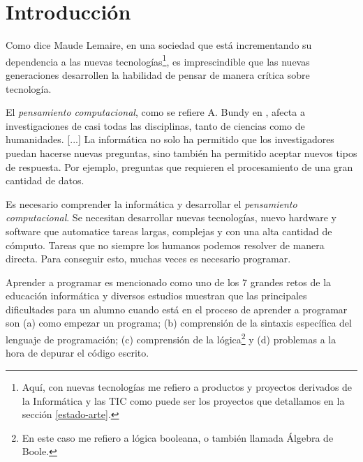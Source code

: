 \chapter{Introducción}\label{introduccion}



Como dice Maude Lemaire\cite{lemaire2014incorporating}, en una sociedad que está incrementando su dependencia a las nuevas tecnologías\footnote{Aquí, con nuevas tecnologías me refiero a productos y proyectos derivados de la Informática y las \acrfull{TIC} como puede ser los proyectos que detallamos en la sección \ref{estado-arte}.}, es imprescindible que las nuevas generaciones desarrollen la habilidad de pensar de manera crítica sobre tecnología.

El \emph{pensamiento computacional}, como se refiere A. Bundy en \cite{bundy2007computational}, afecta a  investigaciones de casi todas las disciplinas, tanto de ciencias como de humanidades. [...] La informática no solo ha permitido que los investigadores puedan hacerse nuevas preguntas, sino también ha permitido aceptar nuevos tipos de respuesta. Por ejemplo, preguntas que requieren el procesamiento de una gran cantidad de datos.  

Es necesario comprender la informática y desarrollar el \emph{pensamiento computacional}. Se necesitan desarrollar nuevas tecnologías, nuevo \gls{hardware} y \gls{software} que automatice tareas largas, complejas y con una alta cantidad de cómputo. Tareas que no siempre los humanos podemos resolver de manera directa. Para conseguir esto, muchas veces es necesario programar. 

Aprender a programar es mencionado como uno de los 7 grandes retos de la educación informática \cite{mcgettrick2005grand} y diversos estudios \cite{renumol2009classification} muestran que las principales dificultades para un alumno cuando está en el proceso de aprender a programar son (a) como empezar un programa; (b) comprensión de la sintaxis específica del lenguaje de programación; (c) comprensión de la lógica\footnote{En este caso me refiero a lógica booleana, o también llamada Álgebra de Boole.} y (d) problemas a la hora de depurar el código escrito. 

